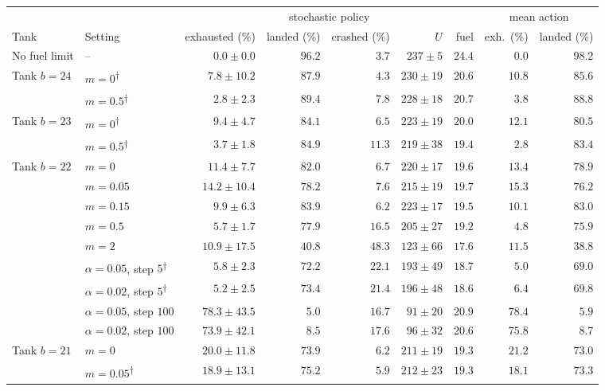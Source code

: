 \setlength{\tabcolsep}{3.5pt}\begin{tabular}{llrrrrrrr}
\toprule
 & & \multicolumn{5}{c}{stochastic policy} & \multicolumn{2}{c}{mean action} \\
\cmidrule(lr){3-7}\cmidrule(lr){8-9}
Tank & Setting & exhausted (\%) & landed (\%) & crashed (\%) & $U$ & fuel & exh.\ (\%) & landed (\%) \\
\midrule
No fuel limit & -- & $0.0\pm0.0$ & $96.2$ & $3.7$ & $237\pm5$ & $24.4$ & $0.0$ & $98.2$ \\
Tank $b=24$ & $m=0$\textsuperscript{$\dagger$} & $7.8\pm10.2$ & $87.9$ & $4.3$ & $230\pm19$ & $20.6$ & $10.8$ & $85.6$ \\
 & $m=0.5$\textsuperscript{$\dagger$} & $2.8\pm2.3$ & $89.4$ & $7.8$ & $228\pm18$ & $20.7$ & $3.8$ & $88.8$ \\
Tank $b=23$ & $m=0$\textsuperscript{$\dagger$} & $9.4\pm4.7$ & $84.1$ & $6.5$ & $223\pm19$ & $20.0$ & $12.1$ & $80.5$ \\
 & $m=0.5$\textsuperscript{$\dagger$} & $3.7\pm1.8$ & $84.9$ & $11.3$ & $219\pm38$ & $19.4$ & $2.8$ & $83.4$ \\
Tank $b=22$ & $m=0$ & $11.4\pm7.7$ & $82.0$ & $6.7$ & $220\pm17$ & $19.6$ & $13.4$ & $78.9$ \\
 & $m=0.05$ & $14.2\pm10.4$ & $78.2$ & $7.6$ & $215\pm19$ & $19.7$ & $15.3$ & $76.2$ \\
 & $m=0.15$ & $9.9\pm6.3$ & $83.9$ & $6.2$ & $223\pm17$ & $19.5$ & $10.1$ & $83.0$ \\
 & $m=0.5$ & $5.7\pm1.7$ & $77.9$ & $16.5$ & $205\pm27$ & $19.2$ & $4.8$ & $75.9$ \\
 & $m=2$ & $10.9\pm17.5$ & $40.8$ & $48.3$ & $123\pm66$ & $17.6$ & $11.5$ & $38.8$ \\
 & $\alpha=0.05$, step $5$\textsuperscript{$\dagger$} & $5.8\pm2.3$ & $72.2$ & $22.1$ & $193\pm49$ & $18.7$ & $5.0$ & $69.0$ \\
 & $\alpha=0.02$, step $5$\textsuperscript{$\dagger$} & $5.2\pm2.5$ & $73.4$ & $21.4$ & $196\pm48$ & $18.6$ & $6.4$ & $69.8$ \\
 & $\alpha=0.05$, step $100$ & $78.3\pm43.5$ & $5.0$ & $16.7$ & $91\pm20$ & $20.9$ & $78.4$ & $5.9$ \\
 & $\alpha=0.02$, step $100$ & $73.9\pm42.1$ & $8.5$ & $17.6$ & $96\pm32$ & $20.6$ & $75.8$ & $8.7$ \\
Tank $b=21$ & $m=0$ & $20.0\pm11.8$ & $73.9$ & $6.2$ & $211\pm19$ & $19.3$ & $21.2$ & $73.0$ \\
 & $m=0.05$\textsuperscript{$\dagger$} & $18.9\pm13.1$ & $75.2$ & $5.9$ & $212\pm23$ & $19.3$ & $18.1$ & $73.3$ \\

\end{tabular}

